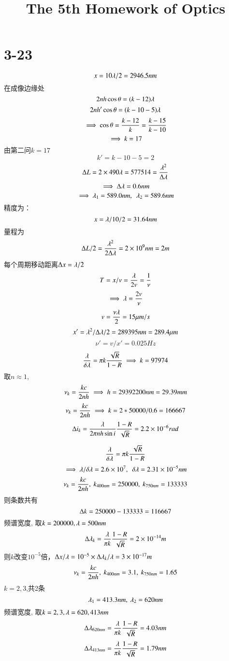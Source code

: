 \documentclass[UTF8,9pt]{ctexart}
\title{The 5th Homework of Optics}
\begin{document}
\maketitle
\section{3-23}
    $$x=10\lambda/2=2946.5nm$$
    在成像边缘处
    $$2nh\cos\theta=(k-12)\lambda$$
    $$2nh'\cos\theta=(k-10-5)\lambda$$
    $$\implies \cos\theta=\frac{k-12}{k}=\frac{k-15}{k-10}$$
    $$\implies k=17$$
    由第二问$k=17$
    $$k'=k-10-5=2$$
$$\Delta L=2\times 490\lambda=577514=\frac{\lambda^2}{\Delta\lambda}$$
$$\implies \Delta\lambda=0.6nm$$
$$\ip \l_1=589.0nm,\ \ \l_2=589.6nm$$
精度为：
$$x=\lambda/10/2=31.64nm$$
量程为
$$\Delta L/2=\frac{\lambda^2}{2\Delta\lambda}=2\times 10^{9} nm=2m$$
    每个周期移动距离$\Delta x=\lambda/2$
    $$T=x/v=\frac{\lambda}{2v}=\frac{1}{\nu}$$
    $$\implies \lambda=\frac{2v}{\nu}$$
    $$v=\frac{\nu\lambda}{2}=15\mu m/s$$
    $$x'=\lambda^2/\Delta\lambda/2=289395nm=289.4\mu m$$
    $$\nu'=v/x'=0.025Hz$$
$$\frac{\lambda}{\delta\lambda}=\pi k\frac{\sqrt{R}}{1-R}\implies k=97974$$
取$n \approx 1$,
$$\nu_k=\frac{kc}{2nh} \implies h=29392200nm=29.39mm$$
    $$\nu_k=\frac{kc}{2nh} \implies k=2*50000/0.6=166667$$
    $$\Delta i_k=\frac{\lambda}{2\pi nh\sin i}\frac{1-R}{\sqrt{R}}=2.2\times 10^{-6} rad$$
    
    $$\frac{\lambda}{\delta\lambda}=\pi k\frac{\sqrt{R}}{1-R}$$
    $$ \implies \lambda/\delta\lambda=2.6\times 10^{7},\ \  \delta\lambda=2.31\times 10^{-5}nm$$
    $$\nu_k=\f{kc}{2nh} , \ k_{400nm}=250000,\ k_{750nm}=133333$$
    则条数共有
    $$\Delta k=250000-133333=116667$$
    频谱宽度, 取$k=200000,\lambda=500nm$
    $$\Delta\lambda_k=\frac{\lambda}{\pi k}\frac{1-R}{\sqrt{R}}=2\times 10^{-14}m$$
    则$k$改变$10^{-5}$倍，$\Delta x/\lambda=10^{-5} \times \Delta\lambda_k/\lambda=3\times 10^{-17}m$
    $$\nu_k=\f{kc}{2nh} , \ k_{400nm}=3.1,\ k_{750nm}=1.65$$
    $k=2,3$,共2条
    $$\lambda_1=413.3nm,\ \lambda_2=620nm$$
    频谱宽度, 取$k=2,3,\lambda=620,413nm$
    $$\Delta\lambda_{620nm}=\frac{\lambda}{\pi k}\frac{1-R}{\sqrt{R}}=4.03nm$$
    $$\Delta\lambda_{413nm}=\frac{\lambda}{\pi k}\frac{1-R}{\sqrt{R}}=1.79nm$$
\end{document}
